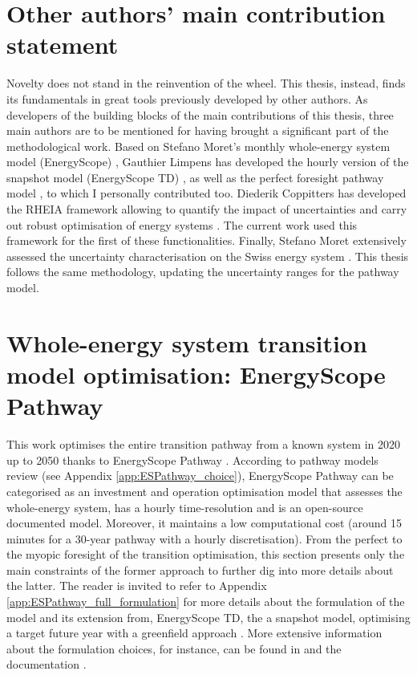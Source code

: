 \section*{Other authors' main contribution statement}
Novelty does not stand in the reinvention of the wheel.  This thesis, instead, finds its fundamentals in great tools previously developed by other authors. As developers of the building blocks of the main contributions of this thesis, three main authors are to be mentioned for having brought a significant part of the methodological work. Based on Stefano Moret's monthly whole-energy system model (\ie EnergyScope) \cite{moret2016strategic}, Gauthier Limpens has developed the hourly version of the snapshot model (\ie EnergyScope TD) \cite{limpens2019energyscope}, as well as the perfect foresight pathway model \cite{limpens2024pathway}, to which I personally contributed too. Diederik Coppitters has developed the RHEIA framework allowing to quantify the impact of uncertainties and carry out robust optimisation of energy systems \cite{coppittersthesis}. The current work used this framework for the first of these functionalities. Finally, Stefano Moret extensively assessed the uncertainty characterisation on the Swiss energy system \cite{Moret2017}. This thesis follows the same methodology, updating the uncertainty ranges for the pathway model.

\section{Whole-energy system transition model optimisation: EnergyScope Pathway}
\label{sec:meth:ES}

This work optimises the entire transition pathway from a known system in 2020 up to 2050 thanks to EnergyScope Pathway \cite{limpens2024pathway}. According to pathway models review (see Appendix \ref{app:ESPathway_choice}), EnergyScope Pathway can be categorised as an investment and operation optimisation model that assesses the whole-energy system, has a hourly time-resolution and is an open-source documented model. Moreover, it maintains a low computational cost (\ie around 15 minutes for a 30-year pathway with a hourly discretisation). From the perfect to the myopic foresight of the transition optimisation, this section presents only the main constraints of the former approach to further dig into more details about the latter. The reader is invited to refer to Appendix \ref{app:ESPathway_full_formulation} for more details about the formulation of the model and its extension from, EnergyScope TD, the a snapshot model, optimising a target future year with a greenfield approach \cite{geidl2006greenfield}. More extensive information about the formulation choices, for instance, can be found in \cite{limpens2024pathway} and the documentation \cite{readthedocs_pathway}.

